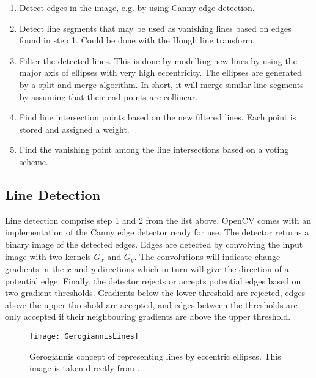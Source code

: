 \begin{enumerate}
	\item Detect edges in the image, e.g. by using Canny edge detection.
	\item Detect line segments that may be used as vanishing lines based on edges found in step 1. Could be done with the Hough line transform.
	\item Filter the detected lines. This is done by modelling new lines by using the major axis of ellipses with very high eccentricity. The ellipses are generated by a split-and-merge algorithm. In short, it will merge similar line segments by assuming that their end points are collinear.
	\item Find line intersection points based on the new filtered lines. Each point is stored and assigned a weight.
	\item Find the vanishing point among the line intersections based on a voting scheme. 
\end{enumerate}

\subsection{Line Detection}

Line detection comprise step 1 and 2 from the list above. OpenCV comes with an implementation of the Canny edge detector ready for use. The detector returns a binary image of the detected edges. Edges are detected by convolving the input image with two kernels $G_x$ and $G_y$. The convolutions will indicate change gradients in the $x$ and $y$ directions which in turn will give the direction of a potential edge. Finally, the detector rejects or accepts potential edges based on two gradient thresholds. Gradients below the lower threshold are rejected, edges above the upper threshold are accepted, and edges between the thresholds are only accepted if their neighbouring gradients are above the upper threshold\cite{cannyedge}. 

\begin{wrapfigure}{r}{0.55\textwidth}
	\vspace{-10pt} %
	\centering
	\texttt{[image: GerogiannisLines]}
	\caption{\label{fig:GerogiannisLines}Gerogiannis concept of representing lines by eccentric ellipses. This image is taken directly from \cite{gerogiannisvp}.}
	\vspace{-60pt} %
\end{wrapfigure}

